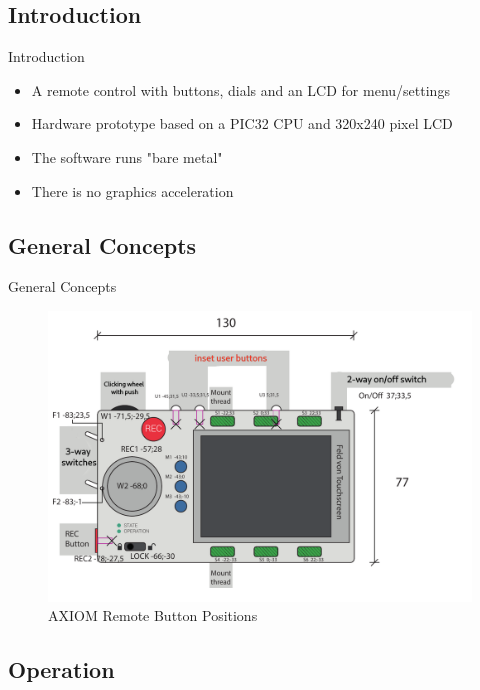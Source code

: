 \documentclass{beamer}
\begin{document}
\subsection{Introduction}

\begin{frame}{Introduction}
	\begin{itemize}
		\item A remote control with buttons, dials and an LCD for menu/settings
		\item Hardware prototype based on a PIC32 CPU and 320x240 pixel LCD
		\item The software runs "bare metal"
		\item There is no graphics acceleration
	\end{itemize}	

\end{frame}

\subsection{General Concepts}

\begin{frame}{General Concepts}
	\begin{center}
		\begin{figure}[h]
		    \centering
		    \includegraphics[width=0.8\linewidth]{images/axiom_remote_bottonPos.png}
		    \caption{AXIOM Remote Button Positions}
		    \label{fig:logo}
		\end{figure}
	\end{center}
\end{frame}

\subsection{Operation}
\end{document}
